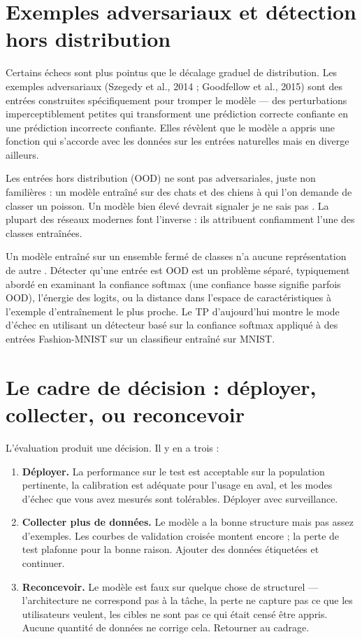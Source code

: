 \section{Exemples adversariaux et détection hors distribution}

Certains échecs sont plus pointus que le décalage graduel de distribution. Les exemples adversariaux (Szegedy et al., 2014 ; Goodfellow et al., 2015) sont des entrées construites spécifiquement pour tromper le modèle --- des perturbations imperceptiblement petites qui transforment une prédiction correcte confiante en une prédiction incorrecte confiante. Elles révèlent que le modèle a appris une fonction qui s'accorde avec les données sur les entrées naturelles mais en diverge ailleurs.

Les entrées hors distribution (OOD) ne sont pas adversariales, juste non familières : un modèle entraîné sur des chats et des chiens à qui l'on demande de classer un poisson. Un modèle bien élevé devrait signaler \og je ne sais pas \fg. La plupart des réseaux modernes font l'inverse : ils attribuent confiamment l'une des classes entraînées.

\begin{intuition}
Un modèle entraîné sur un ensemble fermé de classes n'a aucune représentation de \og autre \fg. Détecter qu'une entrée est OOD est un problème séparé, typiquement abordé en examinant la confiance softmax (une confiance basse signifie parfois OOD), l'énergie des logits, ou la distance dans l'espace de caractéristiques à l'exemple d'entraînement le plus proche. Le TP d'aujourd'hui montre le mode d'échec en utilisant un détecteur basé sur la confiance softmax appliqué à des entrées Fashion-MNIST sur un classifieur entraîné sur MNIST.
\end{intuition}

\section{Le cadre de décision : déployer, collecter, ou reconcevoir}

L'évaluation produit une décision. Il y en a trois :

\begin{enumerate}
  \item \textbf{Déployer.} La performance sur le test est acceptable sur la population pertinente, la calibration est adéquate pour l'usage en aval, et les modes d'échec que vous avez mesurés sont tolérables. Déployer avec surveillance.
  \item \textbf{Collecter plus de données.} Le modèle a la bonne structure mais pas assez d'exemples. Les courbes de validation croisée montent encore ; la perte de test plafonne pour la bonne raison. Ajouter des données étiquetées et continuer.
  \item \textbf{Reconcevoir.} Le modèle est faux sur quelque chose de structurel --- l'architecture ne correspond pas à la tâche, la perte ne capture pas ce que les utilisateurs veulent, les cibles ne sont pas ce qui était censé être appris. Aucune quantité de données ne corrige cela. Retourner au cadrage.
\end{enumerate}

